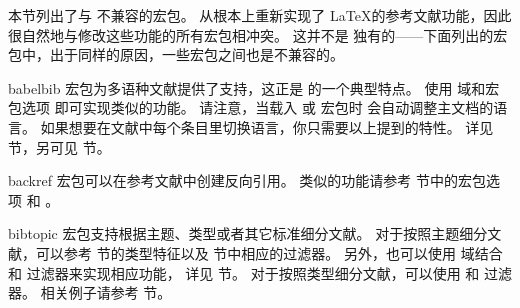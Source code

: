 
本节列出了与 \biblatex 不兼容的宏包。
\biblatex 从根本上重新实现了 \LaTeX 的参考文献功能，因此很自然地与修改这些功能的所有宏包相冲突。
这并不是 \biblatex 独有的——下面列出的宏包中，出于同样的原因，一些宏包之间也是不兼容的。

\begin{marglist}

\item[babelbib]
 宏包为多语种文献提供了支持，这正是 \biblatex 的一个典型特点。
使用  域和宏包选项  即可实现类似的功能。
请注意，当载入  或  宏包时 \biblatex 会自动调整主文档的语言。
如果想要在文献中每个条目里切换语言，你只需要以上提到的特性。
详见  节，另可见  节。

\item[backref]
 宏包可以在参考文献中创建反向引用。
类似的功能请参考  节中的宏包选项  和 。

\item[bibtopic]
 宏包支持根据主题、类型或者其它标准细分文献。
对于按照主题细分文献，可以参考  节的类型特征以及  节中相应的过滤器。
另外，也可以使用  域结合  和  过滤器来实现相应功能，
详见  节。
对于按照类型细分文献，可以使用  和  过滤器。
相关例子请参考  节。


\end{marglist}
